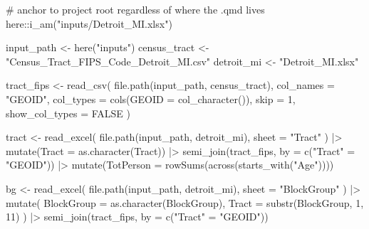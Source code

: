 \documentclass[
  11pt,
]{article}
\newenvironment{Shaded}{\begin{snugshade}}{\end{snugshade}}
\newcommand{\AttributeTok}[1]{\textcolor[rgb]{0.40,0.45,0.13}{#1}}
\newcommand{\CommentTok}[1]{\textcolor[rgb]{0.37,0.37,0.37}{#1}}
\newcommand{\ConstantTok}[1]{\textcolor[rgb]{0.56,0.35,0.01}{#1}}
\newcommand{\DecValTok}[1]{\textcolor[rgb]{0.68,0.00,0.00}{#1}}
\newcommand{\FunctionTok}[1]{\textcolor[rgb]{0.28,0.35,0.67}{#1}}
\newcommand{\NormalTok}[1]{\textcolor[rgb]{0.00,0.23,0.31}{#1}}
\newcommand{\OtherTok}[1]{\textcolor[rgb]{0.00,0.23,0.31}{#1}}
\newcommand{\SpecialCharTok}[1]{\textcolor[rgb]{0.37,0.37,0.37}{#1}}
\newcommand{\StringTok}[1]{\textcolor[rgb]{0.13,0.47,0.30}{#1}}
\begin{document}
\begin{Shaded}
\begin{Highlighting}[]
\CommentTok{\# anchor to project root regardless of where the .qmd lives}
\NormalTok{here}\SpecialCharTok{::}\FunctionTok{i\_am}\NormalTok{(}\StringTok{"inputs/Detroit\_MI.xlsx"}\NormalTok{)}

\NormalTok{input\_path   }\OtherTok{\textless{}{-}} \FunctionTok{here}\NormalTok{(}\StringTok{"inputs"}\NormalTok{)}
\NormalTok{census\_tract }\OtherTok{\textless{}{-}} \StringTok{"Census\_Tract\_FIPS\_Code\_Detroit\_MI.csv"}
\NormalTok{detroit\_mi   }\OtherTok{\textless{}{-}} \StringTok{"Detroit\_MI.xlsx"}

\NormalTok{tract\_fips }\OtherTok{\textless{}{-}} \FunctionTok{read\_csv}\NormalTok{(}
  \FunctionTok{file.path}\NormalTok{(input\_path, census\_tract),}
  \AttributeTok{col\_names =} \StringTok{"GEOID"}\NormalTok{,}
  \AttributeTok{col\_types =} \FunctionTok{cols}\NormalTok{(}\AttributeTok{GEOID =} \FunctionTok{col\_character}\NormalTok{()),}
  \AttributeTok{skip =} \DecValTok{1}\NormalTok{,}
  \AttributeTok{show\_col\_types =} \ConstantTok{FALSE}
\NormalTok{)}

\NormalTok{tract }\OtherTok{\textless{}{-}} \FunctionTok{read\_excel}\NormalTok{(}
  \FunctionTok{file.path}\NormalTok{(input\_path, detroit\_mi),}
  \AttributeTok{sheet =} \StringTok{"Tract"}
\NormalTok{) }\SpecialCharTok{|\textgreater{}}
  \FunctionTok{mutate}\NormalTok{(}\AttributeTok{Tract =} \FunctionTok{as.character}\NormalTok{(Tract)) }\SpecialCharTok{|\textgreater{}}
  \FunctionTok{semi\_join}\NormalTok{(tract\_fips, }\AttributeTok{by =} \FunctionTok{c}\NormalTok{(}\StringTok{"Tract"} \OtherTok{=} \StringTok{"GEOID"}\NormalTok{)) }\SpecialCharTok{|\textgreater{}}
  \FunctionTok{mutate}\NormalTok{(}\AttributeTok{TotPerson =} \FunctionTok{rowSums}\NormalTok{(}\FunctionTok{across}\NormalTok{(}\FunctionTok{starts\_with}\NormalTok{(}\StringTok{"Age"}\NormalTok{))))}

\NormalTok{bg }\OtherTok{\textless{}{-}} \FunctionTok{read\_excel}\NormalTok{(}
  \FunctionTok{file.path}\NormalTok{(input\_path, detroit\_mi),}
  \AttributeTok{sheet =} \StringTok{"BlockGroup"}
\NormalTok{) }\SpecialCharTok{|\textgreater{}}
  \FunctionTok{mutate}\NormalTok{(}
    \AttributeTok{BlockGroup =} \FunctionTok{as.character}\NormalTok{(BlockGroup),}
    \AttributeTok{Tract =} \FunctionTok{substr}\NormalTok{(BlockGroup, }\DecValTok{1}\NormalTok{, }\DecValTok{11}\NormalTok{)}
\NormalTok{  ) }\SpecialCharTok{|\textgreater{}}
  \FunctionTok{semi\_join}\NormalTok{(tract\_fips, }\AttributeTok{by =} \FunctionTok{c}\NormalTok{(}\StringTok{"Tract"} \OtherTok{=} \StringTok{"GEOID"}\NormalTok{))}
\end{Highlighting}
\end{Shaded}
\end{document}
